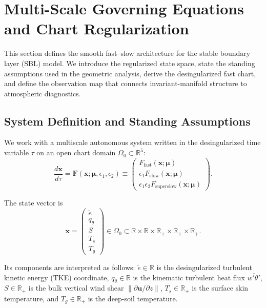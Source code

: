 \section{Multi-Scale Governing Equations and Chart Regularization}

This section defines the smooth fast--slow architecture for the stable boundary layer (SBL) model. We introduce the regularized state space, state the standing assumptions used in the geometric analysis, derive the desingularized fast chart, and define the observation map that connects invariant-manifold structure to atmospheric diagnostics.

\subsection{System Definition and Standing Assumptions}

We work with a multiscale autonomous system written in the desingularized time variable $\tau$ on an open chart domain $\Omega_0 \subset \mathbb{R}^5$:
\begin{equation}
\frac{d\mathbf{x}}{d\tau}
= \mathbf{F}(\mathbf{x};\boldsymbol{\mu},\epsilon_1,\epsilon_2)
\equiv
\begin{pmatrix}
F_{\mathrm{fast}}(\mathbf{x};\boldsymbol{\mu}) \\
\epsilon_1 F_{\mathrm{slow}}(\mathbf{x};\boldsymbol{\mu}) \\
\epsilon_1\epsilon_2 F_{\mathrm{superslow}}(\mathbf{x};\boldsymbol{\mu})
\end{pmatrix}.
\end{equation}

The state vector is
\begin{equation}
\mathbf{x}
= \begin{pmatrix}
\tilde e \\
q_\theta \\
S \\
T_s \\
T_g
\end{pmatrix}
\in \Omega_0
\subset \mathbb{R} \times \mathbb{R} \times \mathbb{R}_+ \times \mathbb{R}_+ \times \mathbb{R}_+.
\end{equation}

Its components are interpreted as follows: $\tilde e \in \mathbb{R}$ is the desingularized turbulent kinetic energy (TKE) coordinate, $q_\theta \in \mathbb{R}$ is the kinematic turbulent heat flux $\overline{w'\theta'}$, $S \in \mathbb{R}_+$ is the bulk vertical wind shear $\lVert \partial \mathbf{u}/\partial z \rVert$, $T_s \in \mathbb{R}_+$ is the surface skin temperature, and $T_g \in \mathbb{R}_+$ is the deep-soil temperature.

